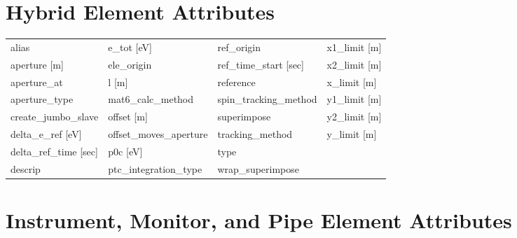  \section{Hybrid Element Attributes}
 \label{s:list.hybrid}
 
 \begin{tabular}{llll} \toprule
alias                            & e_tot [eV]                       & ref_origin                       & x1_limit [m]                     \\
aperture [m]                     & ele_origin                       & ref_time_start [sec]             & x2_limit [m]                     \\
aperture_at                      & l [m]                            & reference                        & x_limit [m]                      \\
aperture_type                    & mat6_calc_method                 & spin_tracking_method             & y1_limit [m]                     \\
create_jumbo_slave               & offset [m]                       & superimpose                      & y2_limit [m]                     \\
delta_e_ref [eV]                 & offset_moves_aperture            & tracking_method                  & y_limit [m]                      \\
delta_ref_time [sec]             & p0c [eV]                         & type                             &                                  \\
descrip                          & ptc_integration_type             & wrap_superimpose                 &                                  \\
 \bottomrule
 \end{tabular}
 \vfill
 
 \section{Instrument, Monitor, and Pipe Element Attributes}
 \label{s:list.instrument}
 
